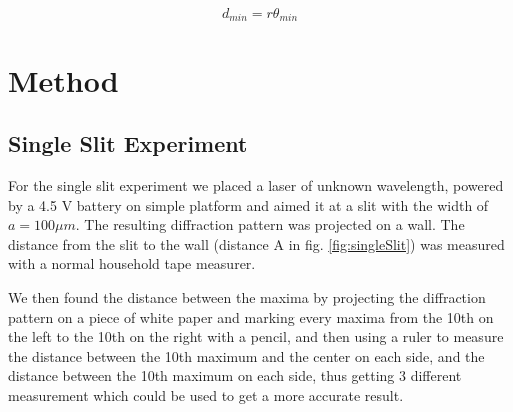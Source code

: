 \documentclass{emulateapj}
\begin{document}
\begin{equation}
d_{min} = r\theta_{min}
\end{equation}\label{eq:skinny}

\section{Method}
\label{sec:method}


\subsection{Single Slit Experiment}
For the single slit experiment we placed a laser of unknown wavelength, powered by a 4.5 V battery on simple platform and aimed it at a slit with the width of  $a = 100\mu m$. The resulting diffraction pattern was projected on a wall. The distance from the slit to the wall (distance A in fig. \ref{fig:singleSlit}) was measured with a normal household tape measurer.

We then found the distance between the maxima by projecting the diffraction pattern on a piece of white paper and marking every maxima from the 10th on the left to the 10th on the right with a pencil, and then using a ruler to measure the distance between the 10th maximum and the center on each side, and the distance between the 10th maximum on each side, thus getting 3 different measurement which could be used to get a more accurate result.\\
\end{document}
